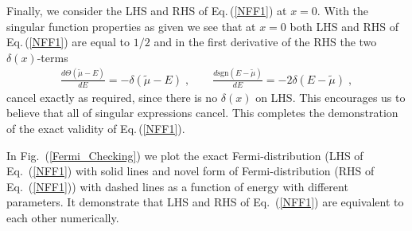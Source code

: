 \documentclass[sn-mathphys,Numbered]{sn-jnl}
\theoremstyle{thmstyleone}%
\theoremstyle{thmstyletwo}%
\theoremstyle{thmstylethree}%
\begin{document}
Finally, we consider the LHS and RHS of Eq.\,(\ref{NFF1}) at $x=0$. With the singular function properties as given we see that at $x=0$ both LHS and RHS of Eq.\,(\ref{NFF1}) are equal to $1/2$ and in the first derivative of the  RHS the two $\delta(x)$-terms 
\begin{align}\label{NFF1b}
\frac{d\Theta(\tilde\mu-E)}{dE}=-\delta(\tilde\mu-E)\;,\qquad 
\frac{d\mathrm{sgn}(E -\tilde\mu)}{dE}=-2\delta(E-\tilde\mu)\;, 
 \end{align}
cancel exactly as required, since there is no $\delta(x)$ on LHS. This encourages us to believe that all of singular expressions cancel. This completes the demonstration of the exact validity of  Eq.\,(\ref{NFF1}). 

In Fig.~(\ref{Fermi_Checking}) we plot the exact Fermi-distribution (LHS of Eq.~(\ref{NFF1}) with solid lines and novel form of Fermi-distribution (RHS of Eq.~(\ref{NFF1})) with dashed lines as a function of energy with different parameters. It demonstrate that 
LHS and RHS of Eq.~(\ref{NFF1}) are equivalent to each other numerically.
\end{document}
